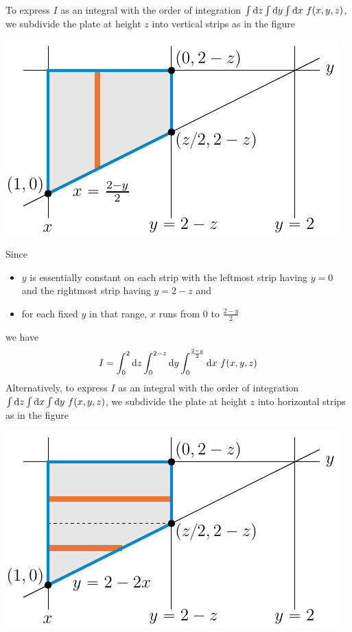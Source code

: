 \begin{eg}
\begin{wfig}
\end{wfig}
To express $I$ as an integral with the order of integration 
$\int\dee{z}\int\dee{y}\int\dee{x}\ f(x,y,z)$, we subdivide the plate at height $z$ into vertical strips as in the figure
\begin{efig}
\begin{center}
    \includegraphics{figures/integration/xchange3v.pdf}
\end{center}
\end{efig}
Since
\begin{itemize} \itemsep1pt \parskip0pt 
\item
$y$ is essentially constant on each strip with the leftmost strip having $y=0$ 
and the rightmost strip having $y=2-z$ and
\item
for each fixed $y$ in that range, $x$ runs from $0$ to $\tfrac{2-y}{2}$
\end{itemize}
we have
\begin{equation*}
I=\int_0^2\dee{z}\int_0^{2-z}\dee{y}\int_0^{\frac{2-y}{2}}\dee{x}\ f(x,y,z)
\end{equation*}
Alternatively, to express $I$ as an integral with the order of integration 
$\int\dee{z}\int\dee{x}\int\dee{y}\ f(x,y,z)$, we subdivide the plate at height $z$ into horizontal strips as in the figure
\begin{efig}
\begin{center}
    \includegraphics{figures/integration/xchange3h.pdf}

\end{center}
\end{efig}
\end{eg}
